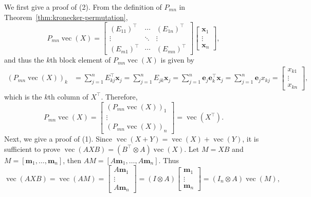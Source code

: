 \begin{Proof}
{We first give a proof of (2). From the definition of $P_{mn}$ in Theorem\ \ref{thm:kronecker-permutation},}
\[P_{mn}\operatorname{vec}(X)=\begin{bmatrix}
(E_{11})^{\top}&\cdots&(E_{1n})^{\top}\\\vdots&\ddots&\vdots\\(E_{m1})^{\top}&\cdots&(E_{mn})^{\top}
\end{bmatrix}\begin{bmatrix}\boldsymbol{x}_1\\\vdots\\\boldsymbol{x}_n\end{bmatrix},\]
{and thus the $k$th block element of $P_{mn}\operatorname{vec}(X)$ is given by}
\[\begin{aligned}
(P_{mn}\operatorname{vec}(X))_k&=\sum_{j=1}^nE_{kj}^{\top}\boldsymbol{x}_j
=\sum_{j=1}^nE_{jk}\boldsymbol{x}_j=\sum_{j=1}^n\boldsymbol{e}_j\boldsymbol{e}_k^{\top}\boldsymbol{x}_j
=\sum_{j=1}^n\boldsymbol{e}_jx_{kj}=\begin{bmatrix}x_{k1}\\\vdots\\x_{kn}\end{bmatrix},
\end{aligned}\]
{which is the $k$th column of $X^{\top}$. Therefore,}
\[P_{mn}\operatorname{vec}(X)=\begin{bmatrix}(P_{mn}\operatorname{vec}(X))_1\\\vdots\\(P_{mn}\operatorname{vec}(X))_n\end{bmatrix}=\operatorname{vec}(X^{\top}).\]
{Next, we give a proof of (1). Since $\operatorname{vec}(X+Y)=\operatorname{vec}(X)+\operatorname{vec}(Y)$, it is sufficient to prove $\operatorname{vec}(AXB)=(B^{\top}\otimes A)\operatorname{vec}(X)$. Let $M=XB$ and $M=[\boldsymbol{m}_1,\ldots,\boldsymbol{m}_n]$, then $AM=[A\boldsymbol{m}_1,\ldots,A\boldsymbol{m}_n]$. Thus}
\begin{equation}\label{eq:vectorized-left-multiplication}
\operatorname{vec}(AXB)=\operatorname{vec}(AM)=\begin{bmatrix}A\boldsymbol{m}_1\\\vdots\\A\boldsymbol{m}_n\end{bmatrix}
=(I\otimes A)\begin{bmatrix}\boldsymbol{m}_1\\\vdots\\\boldsymbol{m}_n\end{bmatrix}=(I_n\otimes A)\operatorname{vec}(M),

\end{equation}
\end{Proof}
